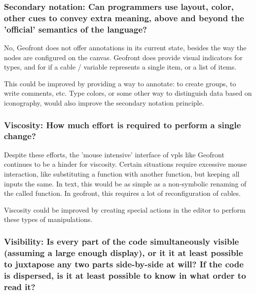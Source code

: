 


\subsubsection*{Secondary notation: Can programmers use layout, color, other cues to convey extra meaning, above and beyond the 'official' semantics of the language?}

No, Geofront does not offer annotations in its current state, besides the way the nodes are configured on the canvas.  
Geofront does provide visual indicators for types, and for if a cable / variable represents a single item, or a list of items.

This could be improved by providing a way to annotate: to create groups, to write comments, etc. 
Type colors, or some other way to distinguish data based on iconography, would also improve the secondary notation principle.

\subsubsection*{Viscosity: How much effort is required to perform a single change?}

Despite these efforts, the 'mouse intensive' interface of vpls like Geofront continues to be a hinder for viscosity.
Certain situations require excessive mouse interaction, like substituting a function with another function, but keeping all inputs the same.
In text, this would be as simple as a non-symbolic renaming of the called function.
In geofront, this requires a lot of reconfiguration of cables. 

Viscosity could be improved by creating special actions in the editor to perform these types of manipulations.  

\subsubsection*{Visibility: Is every part of the code simultaneously visible (assuming a large enough display), or it it at least possible to juxtapose any two parts side-by-side at will? If the code is dispersed, is it at least possible to know in what order to read it?}

